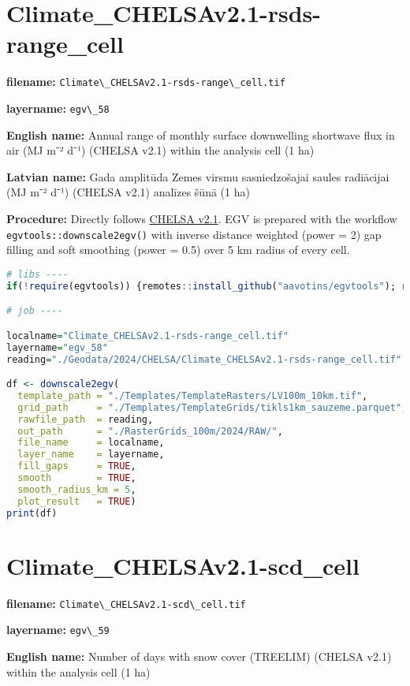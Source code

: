 \documentclass[
]{book}
\newcommand{\passthrough}[1]{#1}
\begin{document}
\section{Climate\_CHELSAv2.1-rsds-range\_cell}\label{ch06.058}

\textbf{filename:} \passthrough{\lstinline!Climate\_CHELSAv2.1-rsds-range\_cell.tif!}

\textbf{layername:} \passthrough{\lstinline!egv\_58!}

\textbf{English name:} Annual range of monthly surface downwelling shortwave flux in air (MJ m⁻² d⁻¹) (CHELSA v2.1) within the analysis cell (1 ha)

\textbf{Latvian name:} Gada amplitūda Zemes virsmu sasniedzošajai saules radiācijai (MJ m⁻² d⁻¹) (CHELSA v2.1) analīzes šūnā (1 ha)

\textbf{Procedure:} Directly follows \hyperref[Ch04.11]{CHELSA v2.1}. EGV is prepared with the
workflow \passthrough{\lstinline!egvtools::downscale2egv()!} with inverse distance weighted (power = 2)
gap filling and soft smoothing (power = 0.5) over 5 km radius of every cell.

\begin{lstlisting}[language=R]
# libs ----
if(!require(egvtools)) {remotes::install_github("aavotins/egvtools"); require(egvtools)}

# job ----

localname="Climate_CHELSAv2.1-rsds-range_cell.tif"
layername="egv_58"
reading="./Geodata/2024/CHELSA/Climate_CHELSAv2.1-rsds-range_cell.tif"

df <- downscale2egv(
  template_path = "./Templates/TemplateRasters/LV100m_10km.tif",
  grid_path     = "./Templates/TemplateGrids/tikls1km_sauzeme.parquet",
  rawfile_path  = reading,
  out_path      = "./RasterGrids_100m/2024/RAW/",
  file_name     = localname,
  layer_name    = layername,
  fill_gaps     = TRUE,
  smooth        = TRUE,
  smooth_radius_km = 5,
  plot_result   = TRUE)
print(df)
\end{lstlisting}

\section{Climate\_CHELSAv2.1-scd\_cell}\label{ch06.059}

\textbf{filename:} \passthrough{\lstinline!Climate\_CHELSAv2.1-scd\_cell.tif!}

\textbf{layername:} \passthrough{\lstinline!egv\_59!}

\textbf{English name:} Number of days with snow cover (TREELIM) (CHELSA v2.1) within the analysis cell (1 ha)
\end{document}
